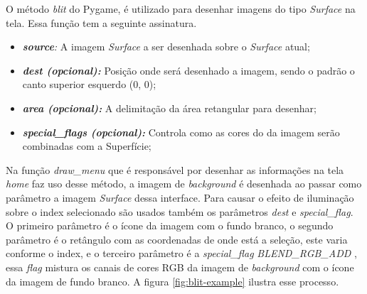 O método \textit{blit} do Pygame, é utilizado para desenhar imagens do tipo \textit{Surface} na tela. Essa função tem a seguinte assinatura.
\begin{itemize}
    \item \textit{\textbf{source}:} A imagem \textit{Surface} a ser desenhada sobre o \textit{Surface} atual;
    \item \textit{\textbf{dest (opcional):}} Posição onde será desenhado a imagem, sendo o padrão o canto superior esquerdo (0, 0);
    \item \textit{\textbf{area (opcional):}} A delimitação da área retangular para desenhar;
    \item \textit{\textbf{special\_flags (opcional):}} Controla como as cores do da imagem serão combinadas com a Superfície;
\end{itemize}

Na função \textit{draw\_menu} que é responsável por desenhar as informações na tela \textit{home} faz uso desse método, a imagem de \textit{background} é desenhada ao passar como parâmetro a imagem \textit{Surface} dessa interface. Para causar o efeito de iluminação sobre o index selecionado são usados também os parâmetros \textit{dest} e \textit{special\_flag}. O primeiro parâmetro é o ícone da imagem com o fundo branco, o segundo parâmetro é o retângulo com as coordenadas de onde está a seleção, este varia conforme o index, e o terceiro parâmetro é a \textit{special\_flag} \textit{BLEND\_RGB\_ADD }, essa \textit{flag} mistura os canais de cores RGB da imagem de \textit{background} com o ícone da imagem de fundo branco. A figura \ref{fig:blit-example} ilustra esse processo.


